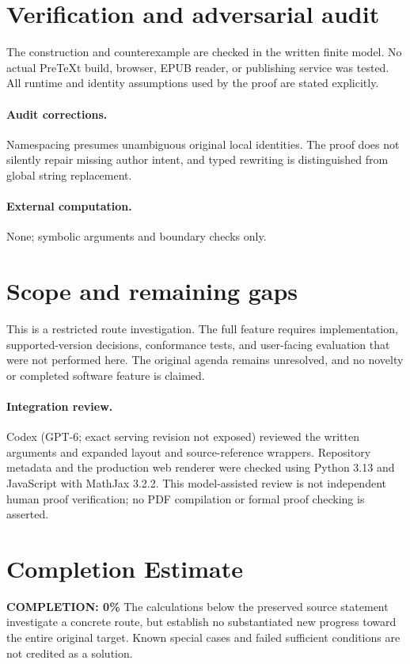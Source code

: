 \documentclass[11pt]{article}
\begin{document}
\section{Verification and adversarial audit}
The construction and counterexample are checked in the written finite model. No actual PreTeXt build, browser, EPUB reader, or publishing service was tested. All runtime and identity assumptions used by the proof are stated explicitly.
\paragraph{Audit corrections.} Namespacing presumes unambiguous original local identities. The proof does not silently repair missing author intent, and typed rewriting is distinguished from global string replacement.
\paragraph{External computation.} None; symbolic arguments and boundary checks only.
\section{Scope and remaining gaps}
This is a restricted route investigation. The full feature requires implementation, supported-version decisions, conformance tests, and user-facing evaluation that were not performed here. The original agenda remains unresolved, and no novelty or completed software feature is claimed.
\paragraph{Integration review.} Codex (GPT-6; exact serving revision not exposed) reviewed the written arguments and expanded layout and source-reference wrappers. Repository metadata and the production web renderer were checked using Python 3.13 and JavaScript with MathJax 3.2.2. This model-assisted review is not independent human proof verification; no PDF compilation or formal proof checking is asserted.

\section{Completion Estimate}
\noindent\textbf{COMPLETION: 0\%}
The calculations below the preserved source statement investigate a concrete route,
but establish no substantiated new progress toward the entire original target.
Known special cases and failed sufficient conditions are not credited as a solution.
\end{document}
